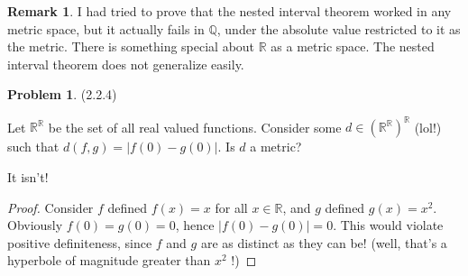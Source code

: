 \documentclass[11pt]{article}
\newcommand{\R}{\mathbb{R}}
\newcommand{\Q}{\mathbb{Q}}
\theoremstyle{definition}
\newtheorem{remark}{Remark}
\newtheorem{problem}{Problem}
\begin{document}
\begin{remark}
I had tried to prove that the nested interval theorem worked in any metric space, but it actually fails in $\Q$, under the absolute value restricted to it as the metric. There is something special about $\R$ as a metric space. The nested interval theorem does not generalize easily.
\end{remark}

\begin{problem}(2.2.4)

Let $\R^\R$ be the set of all real valued functions. Consider some $d\in (\R^\R)^\R$ (lol!) such that $d(f,g) = |f(0) - g(0)|$. Is $d$ a metric?
\end{problem}
It isn't!
\begin{proof}
Consider $f$ defined $f(x) = x$ for all $x\in \R$, and $g$ defined $g(x) = x^2$. Obviously $f(0) = g(0) = 0$, hence $|f(0)- g(0)| = 0$. This would violate positive definiteness, since $f$ and $g$ are as distinct as they can be! (well, that's a hyperbole of magnitude greater than $x^2$ !)
\end{proof}
\end{document}
